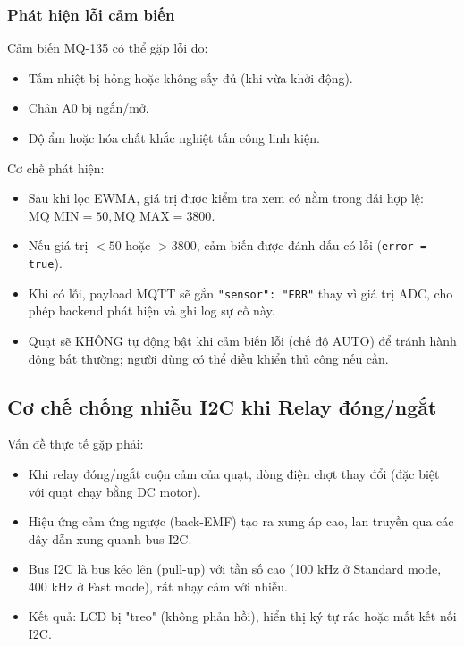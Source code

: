 \documentclass[../BTL_PTIT.tex]{subfiles}
\begin{document}
\subsubsection{Phát hiện lỗi cảm biến}
Cảm biến MQ-135 có thể gặp lỗi do:
\begin{itemize}[label=\textbullet]
    \item Tấm nhiệt bị hỏng hoặc không sấy đủ (khi vừa khởi động).
    \item Chân A0 bị ngắn/mở.
    \item Độ ẩm hoặc hóa chất khắc nghiệt tấn công linh kiện.
\end{itemize}

Cơ chế phát hiện:
\begin{itemize}[label=\textbullet]
    \item Sau khi lọc EWMA, giá trị được kiểm tra xem có nằm trong dải hợp lệ: $\text{MQ\_MIN} = 50, \text{MQ\_MAX} = 3800$.
    \item Nếu giá trị $< 50$ hoặc $> 3800$, cảm biến được đánh dấu có lỗi (\texttt{error = true}).
    \item Khi có lỗi, payload MQTT sẽ gắn \texttt{"sensor": "ERR"} thay vì giá trị ADC, cho phép backend phát hiện và ghi log sự cố này.
    \item Quạt sẽ KHÔNG tự động bật khi cảm biến lỗi (chế độ AUTO) để tránh hành động bất thường; người dùng có thể điều khiển thủ công nếu cần.
\end{itemize}

\subsection{Cơ chế chống nhiễu I2C khi Relay đóng/ngắt}
Vấn đề thực tế gặp phải:
\begin{itemize}[label=\textbullet]
    \item Khi relay đóng/ngắt cuộn cảm của quạt, dòng điện chợt thay đổi (đặc biệt với quạt chạy bằng DC motor).
    \item Hiệu ứng cảm ứng ngược (back-EMF) tạo ra xung áp cao, lan truyền qua các dây dẫn xung quanh bus I2C.
    \item Bus I2C là bus kéo lên (pull-up) với tần số cao (100 kHz ở Standard mode, 400 kHz ở Fast mode), rất nhạy cảm với nhiễu.
    \item Kết quả: LCD bị "treo" (không phản hồi), hiển thị ký tự rác hoặc mất kết nối I2C.
\end{itemize}
\end{document}
